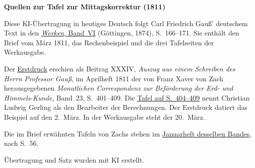 \clearpage\thispagestyle{empty}
\begin{center}{\textbf{Quellen zur Tafel zur Mittagskorrektur (1811)}}\end{center}
\noindent Diese KI-Übertragung in heutiges Deutsch folgt Carl Friedrich Gauß' deutschem Text in den \href{https://gdz.sub.uni-goettingen.de/id/PPN236007467}{\textit{Werken}, Band~VI} (Göttingen, 1874), S.~166--171. Sie enthält den Brief vom März 1811, das Rechenbeispiel und die drei Tafelseiten der Werkausgabe.
\par\smallskip\noindent Der \href{https://www.digitale-sammlungen.de/en/view/bsb10538612?page=411}{Erstdruck} erschien als Beitrag XXXIV, \textit{Auszug aus einem Schreiben des Herrn Professor Gauß}, im Aprilheft 1811 der von Franz Xaver von Zach herausgegebenen \textit{Monatlichen Correspondenz zur Beförderung der Erd- und Himmels-Kunde}, Band~23, S.~401--409. Die \href{https://www.digitale-sammlungen.de/en/view/bsb10538612?page=414}{Tafel auf S.~404--409} nennt Christian Ludwig Gerling als den Bearbeiter der Berechnungen. Der Erstdruck datiert das Beispiel auf den 2.~März. In der Werkausgabe steht der 20.~März.
\par\smallskip\noindent Die im Brief erwähnten Tafeln von Zachs stehen im \href{https://www.digitale-sammlungen.de/en/view/bsb10538612?page=65}{Januarheft desselben Bandes}, nach S.~56.
\par\smallskip\noindent Übertragung und Satz wurden mit KI erstellt.
\clearpage
